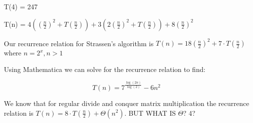 \documentclass[12pt]{article}
\begin{document}
\noindent T(4) =  247
\medskip

\noindent T(n) = $4((\frac{n}{2})^2 + T(\frac{n}{2})) + 3(2(\frac{n}{2})^2 + T(\frac{n}{2})) + 8(\frac{n}{2})^2$
\bigskip

\noindent Our recurrence relation for Strassen's algorithm is $T(n) = 18(\frac{n}{2})^2 + 7\cdot T(\frac{n}{2})$ where $n=2^x, n >1$
\bigskip

\noindent Using Mathematica we can solve for the recurrence relation to find:

$$T(n) = 7^{\frac{\log(2n)}{\log(2)}} - 6n^2$$

\noindent We know that for regular divide and conquer matrix multiplication the recurrence relation is $T(n) = 8\cdot T(\frac{n}{2}) + \Theta(n^2)$.  BUT WHAT IS $\Theta$? 4?

\end{document}
